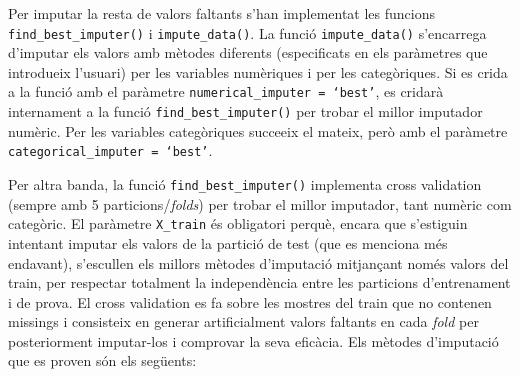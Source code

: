 Per imputar la resta de valors faltants s'han implementat les funcions \texttt{find\_best\_imputer()} i \texttt{impute\_data()}. La funció \texttt{impute\_data()} s'encarrega d'imputar els valors amb mètodes diferents (especificats en els paràmetres que introdueix l'usuari) per les variables numèriques i per les categòriques. Si es crida a la funció amb el paràmetre \texttt{numerical\_imputer = `best'}, es cridarà internament a la funció \texttt{find\_best\_imputer()} per trobar el millor imputador numèric. Per les variables categòriques succeeix el mateix, però amb el paràmetre \texttt{categorical\_imputer = `best'}.

Per altra banda, la funció \texttt{find\_best\_imputer()} implementa cross validation (sempre amb 5 particions/\textit{folds}) per trobar el millor imputador, tant numèric com categòric. El paràmetre \texttt{X\_train} és obligatori perquè, encara que s'estiguin intentant imputar els valors de la partició de test (que es menciona més endavant), s'escullen els millors mètodes d'imputació mitjançant només valors del train, per respectar totalment la independència entre les particions d'entrenament i de prova. El cross validation es fa sobre les mostres del train que no contenen missings i consisteix en generar artificialment valors faltants en cada \textit{fold} per posteriorment imputar-los i comprovar la seva eficàcia. Els mètodes d'imputació que es proven són els següents:
